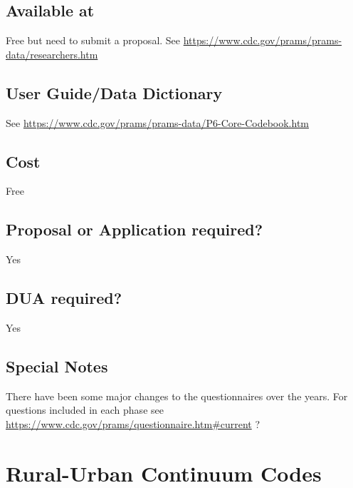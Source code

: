 \documentclass[
]{book}
\begin{document}
\hypertarget{available-at-73}{%
\section{Available at}\label{available-at-73}}

Free but need to submit a proposal. See \url{https://www.cdc.gov/prams/prams-data/researchers.htm}

\hypertarget{user-guidedata-dictionary-73}{%
\section{User Guide/Data Dictionary}\label{user-guidedata-dictionary-73}}

See \url{https://www.cdc.gov/prams/prams-data/P6-Core-Codebook.htm}

\hypertarget{cost-73}{%
\section{Cost}\label{cost-73}}

Free

\hypertarget{proposal-or-application-required-73}{%
\section{Proposal or Application required?}\label{proposal-or-application-required-73}}

Yes

\hypertarget{dua-required-73}{%
\section{DUA required?}\label{dua-required-73}}

Yes

\hypertarget{special-notes-73}{%
\section{Special Notes}\label{special-notes-73}}

There have been some major changes to the questionnaires over the years. For questions included in each phase see \url{https://www.cdc.gov/prams/questionnaire.htm\#current} ?

\mainmatter

\hypertarget{rural-urban-continuum-codes}{%
\chapter{Rural-Urban Continuum Codes}\label{rural-urban-continuum-codes}}
\end{document}
